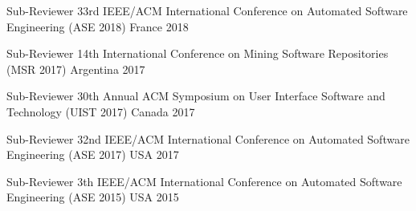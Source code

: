 \begin{cvhonors}
  \cvhonor
    {Sub-Reviewer} %
    {33rd {IEEE}/{ACM} International Conference on Automated Software Engineering ({ASE} 2018)} %
    {France} %
    {2018} %

  \cvhonor
    {Sub-Reviewer} %
    {14th International Conference on Mining Software Repositories ({MSR} 2017)} %
    {Argentina} %
    {2017} %

  \cvhonor
    {Sub-Reviewer} %
    {30th Annual {ACM} Symposium on User Interface Software and Technology ({UIST} 2017)} %
    {Canada} %
    {2017} %

  \cvhonor
    {Sub-Reviewer} %
    {32nd {IEEE}/{ACM} International Conference on Automated Software Engineering ({ASE} 2017)} %
    {USA} %
    {2017} %

  \cvhonor
    {Sub-Reviewer} %
    {3th {IEEE}/{ACM} International Conference on Automated Software Engineering ({ASE} 2015)} %
    {USA} %
    {2015} %

\end{cvhonors}
